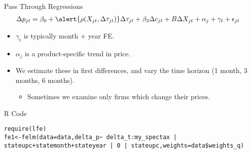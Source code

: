 \documentclass[aspectratio=169]{beamer}
\begin{document}
\begin{frame}{Pass Through Regressions}
\begin{eqnarray*}
\Delta p_{jt} =  \beta_0 + \alert{\rho(X_{jt}, \Delta \tau_{jt}) } \Delta \tau_{jt} + \beta_2 \Delta c_{jt} + B\Delta X_{jt} + \alpha_j + \gamma_t + \epsilon_{jt}
\end{eqnarray*}
\begin{itemize}
\item $\gamma_t$ is typically month $+$ year FE.
\item $\alpha_j$ is a product-specific trend in price.
\item We estimate these in first differences, and vary the time horizon (1 month, 3 months, 6 months).
\begin{itemize}
\item Sometimes we  examine only firms which change their prices.
\end{itemize}
\end{itemize}
\end{frame}

\begin{frame}[fragile]{R Code}
\begin{verbatim}
require(lfe)
fe1<-felm(data=data,delta_p~ delta_t:my_spectax | stateupc+statemonth+stateyear | 0 | stateupc,weights=data$weights_q)
\end{verbatim}
\end{frame}
\end{document}
